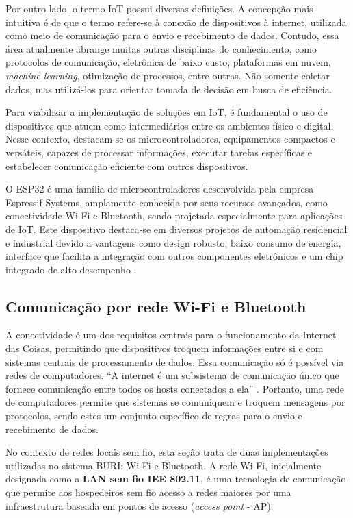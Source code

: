 \documentclass[alpha-refs,brazilian]{RBCA_v3.0}
\begin{document}
Por outro lado, o termo IoT possui diversas definições. A concepção mais intuitiva é de que o termo refere-se à conexão de dispositivos à internet, utilizada como meio de comunicação para o envio e recebimento de dados. Contudo, essa 
área atualmente abrange muitas outras disciplinas do conhecimento, como protocolos de comunicação, eletrônica de baixo custo, plataformas em nuvem, \textit{machine learning}, otimização de processos, entre outras. Não somente coletar dados, mas 
utilizá-los para orientar tomada de decisão em busca de eficiência.

Para viabilizar a implementação de soluções em IoT, é fundamental o uso de dispositivos que atuem como intermediários entre os ambientes físico e digital. Nesse contexto, destacam-se os microcontroladores, equipamentos compactos e versáteis, 
capazes de processar informações, executar tarefas específicas e estabelecer comunicação eficiente com outros dispositivos.

O ESP32 é uma família de microcontroladores desenvolvida pela empresa Espressif Systems, amplamente conhecida por seus recursos avançados, como conectividade Wi-Fi e Bluetooth, sendo projetada especialmente para aplicações de IoT. Este dispositivo 
destaca-se em diversos projetos de automação residencial e industrial devido a vantagens como design robusto, baixo consumo de energia, interface que facilita a integração com outros componentes eletrônicos e um chip integrado de alto desempenho \citep{esp32-espressif}.

\subsection{Comunicação por rede Wi-Fi e Bluetooth}\label{sec01:sub2:redes}

A conectividade é um dos requisitos centrais para o funcionamento da Internet das Coisas, permitindo que dispositivos troquem informações entre si e com sistemas centrais de processamento de dados. Essa comunicação só é possível via 
redes de computadores. ``A internet é um subsistema de comunicação único que fornece comunicação entre todos os hosts conectados a ela'' \citep[pp. 96]{spd-coulouris2013}. Portanto, uma rede de computadores permite que sistemas se 
comuniquem e troquem mensagens por protocolos, sendo estes um conjunto específico de regras para o envio e recebimento de dados.

No contexto de redes locais sem fio, esta seção trata de duas implementações utilizadas no sistema BURI: Wi-Fi e Bluetooth. A rede Wi-Fi, inicialmente designada como a \textbf{LAN sem fio IEE 802.11}, é uma tecnologia de comunicação 
que permite aos hospedeiros sem fio acesso a redes maiores por uma infraestrutura baseada em pontos de acesso (\textit{access point} - AP). 
\end{document}
